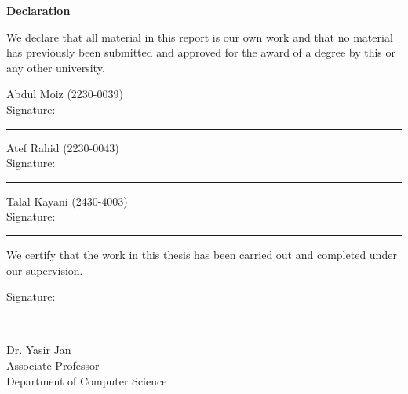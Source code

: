 \clearpage
\thispagestyle{plain}
\begin{center}
{\fontsize{16}{20}\bfseries Declaration\par}
\end{center}
\vspace{0.25in}

We declare that all material in this report is our own work and that no material has
previously been submitted and approved for the award of a degree by this or any other
university.

\vspace{0.5in}
Abdul Moiz \quad (2230-0039)\\[2pt]
Signature: \rule{2.4in}{0.4pt}

\vspace{0.3in}
Atef Rahid \quad (2230-0043)\\[2pt]
Signature: \rule{2.4in}{0.4pt}

\vspace{0.3in}
Talal Kayani \quad (2430-4003)\\[2pt]
Signature: \rule{2.4in}{0.4pt}

\vspace{0.6in}
We certify that the work in this thesis has been carried out and completed under our
supervision.

\vspace{0.5in}
Signature: \rule{2.4in}{0.4pt}\\[4pt]
Dr. Yasir Jan\\
Associate Professor\\
Department of Computer Science

